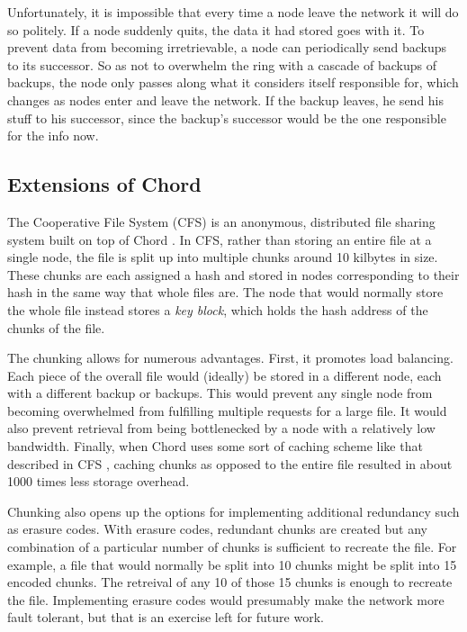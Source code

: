 \documentclass[conference, compsocconf, letterpaper]{IEEEtran}
\begin{document}
Unfortunately, it is impossible that every time a node leave the network it will do so politely.  If a node suddenly quits, the data it had stored goes with it. To prevent data from becoming irretrievable, a node can periodically send backups to its successor.  So as not to overwhelm the ring with a cascade of backups of backups, the node only passes along what it considers itself responsible for, which changes as nodes enter and leave the network.  If the backup leaves, he send his stuff to his successor, since the backup's successor would be the one responsible for the info now. 


\subsection{Extensions of Chord}

The Cooperative File System (CFS) is an anonymous, distributed file sharing system built on top of Chord \cite{CFS}.  In CFS, rather than storing an entire file at a single node, the file is split up into multiple chunks around 10 kilbytes in size.  These chunks are each assigned a hash and stored in nodes corresponding to their hash in the same way that whole files are.  The node that would normally store the whole file instead stores a \emph{key block}, which holds the hash address of the chunks of the file. 

The chunking allows for numerous advantages.  First, it promotes load balancing. Each piece of the overall file would (ideally) be stored in a different node, each with a different backup or backups.  This would prevent any single node from becoming overwhelmed from fulfilling multiple requests for a large file.  It would also prevent retrieval from being bottlenecked by a node with a relatively low bandwidth. Finally, when Chord uses some sort of caching scheme like that described in CFS \cite{CFS}, caching chunks as opposed to the entire file resulted in about 1000 times less storage overhead.  


Chunking also opens up the options for implementing additional redundancy such as erasure codes\cite{rizzo1997effective}. With erasure codes, redundant chunks are created but any combination of a particular number of chunks is sufficient to recreate the file.  For example, a file that would normally be split into 10 chunks might be split into 15 encoded chunks.  The retreival of any 10 of those 15 chunks is enough to recreate the file.  Implementing erasure codes would presumably make the network more fault tolerant, but that is an exercise left for future work.
\end{document}
